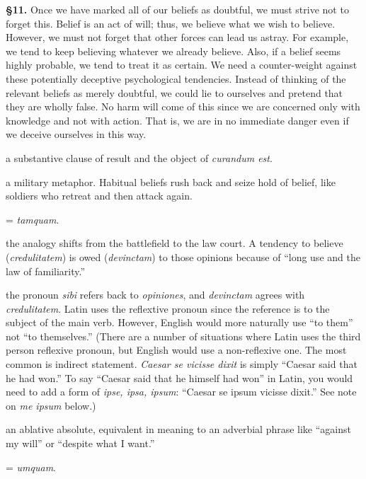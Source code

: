 \prenotes

\textbf{§11.} Once we have marked all of our beliefs as doubtful, we must strive not to forget this. Belief is an act of will; thus, we believe what we wish to believe. However, we must not forget that other forces can lead us astray. For example, we tend to keep believing whatever we already believe. Also, if a belief seems highly probable, we tend to treat it as certain. We need a counter-weight against these potentially deceptive psychological tendencies. Instead of thinking of the relevant beliefs as merely doubtful, we could lie to ourselves and pretend that they are wholly false. No harm will come of this since we are concerned only with knowledge and not with action. That is, we are in no immediate danger even if we deceive ourselves in this way.

 a substantive clause of result and the object of \textit{curandum est}.

 a military metaphor. Habitual beliefs rush back and seize hold of belief, like soldiers who retreat and then attack again.

 = \textit{tamquam}. 

 the analogy shifts from the battlefield to the law court. A tendency to believe (\textit{credulitatem}) is owed (\textit{devinctam}) to those opinions because of ``long use and the law of familiarity.''

 the pronoun \textit{sibi} refers back to \textit{opiniones}, and \textit{devinctam} agrees with \textit{credulitatem}. Latin uses the reflextive pronoun since the reference is to the subject of the main verb. However, English would more naturally use ``to them'' not ``to themselves.'' (There are a number of situations where Latin uses the third person reflexive pronoun, but English would use a non-reflexive one. The most common is indirect statement. \textit{Caesar se vicisse dixit} is simply ``Caesar said that he had won.'' To say ``Caesar said that he himself had won'' in Latin, you would need to add a form of \textit{ipse, ipsa, ipsum}: ``Caesar se ipsum vicisse dixit.'' See note on \textit{me ipsum} below.)

 an ablative absolute, equivalent in meaning to an adverbial phrase like ``against my will'' or ``despite what I want.''

 = \textit{umquam}.

